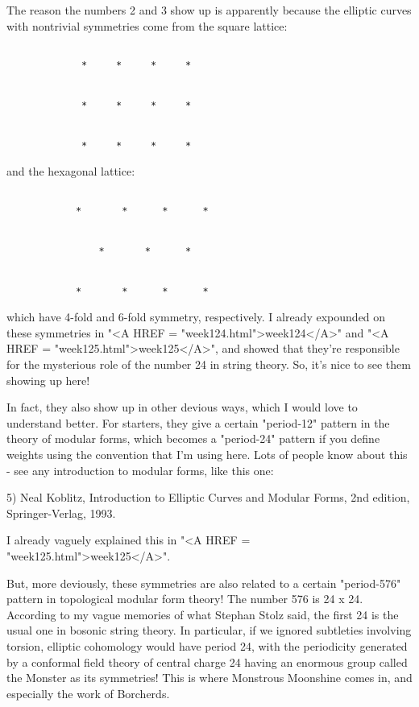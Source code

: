 The reason the numbers 2 and 3 show up is apparently because
the elliptic curves with nontrivial symmetries come from the 
square lattice:


\begin{verbatim}

             *     *     *     *


             *     *     *     *


             *     *     *     *
\end{verbatim}
    
and the hexagonal lattice:


\begin{verbatim}

            *       *      *      *


                *       *      *                


            *       *      *      *
\end{verbatim}
    
which have 4-fold and 6-fold symmetry, respectively.   I already 
expounded on these symmetries in "<A HREF = "week124.html">week124</A>" and "<A HREF = "week125.html">week125</A>", and showed 
that they're responsible for the mysterious role of the number 24 in 
string theory.  So, it's nice to see them showing up here!

In fact, they also show up in other devious ways, which I would   
love to understand better.  For starters, they give a certain
"period-12" pattern in the theory of modular forms, which becomes
a "period-24" pattern if you define weights using the convention 
that I'm using here.  Lots of people know about this - see any 
introduction to modular forms, like this one:

5) Neal Koblitz, Introduction to Elliptic Curves and Modular Forms, 
2nd edition, Springer-Verlag, 1993. 

I already vaguely explained this 
in "<A HREF = "week125.html">week125</A>".

But, more deviously, these symmetries are also related to a certain 
"period-576" pattern in topological modular form theory!  The number
576 is 24 x 24.  According to my vague memories of what Stephan Stolz
said, the first 24 is the usual one in bosonic string theory.  In
particular, if we ignored subtleties involving torsion, elliptic 
cohomology would have period 24, with the periodicity generated 
by a conformal field theory of central charge 24 having an enormous
group called the Monster as its symmetries!  This is where Monstrous 
Moonshine comes in, and especially the work of Borcherds.

